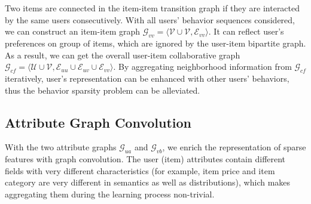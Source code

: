 Two items are connected in the item-item transition graph if they are interacted by the same users consecutively.
With all users' behavior sequences considered, we can construct an item-item graph $\mathcal{G}_{vv}=\langle \mathcal{V}\cup\mathcal{V}, \mathcal{E}_{vv}\rangle$. It can reflect user's preferences on group of items, which are ignored by the user-item bipartite graph. 
As a result, we can get the overall user-item collaborative graph $\mathcal{G}_{cf}=\langle \mathcal{U}\cup\mathcal{V}, \mathcal{E}_{uu}\cup\mathcal{E}_{uv}\cup\mathcal{E}_{vv}\rangle$.
By aggregating neighborhood information from $\mathcal{G}_{cf}$ iteratively, user's representation can be enhanced with other users’ behaviors, thus the behavior sparsity problem can be alleviated. 



\subsection{Attribute Graph Convolution}\label{Attribute Graph Convolution}
With the two attribute graphs $\mathcal{G}_{ua}$ and $\mathcal{G}_{vb}$, we enrich the representation of sparse features with graph convolution.
The user (item) attributes contain different fields with very different characteristics (for example, item price and item category are very different in semantics as well as distributions), which makes aggregating them during the learning process non-trivial.

